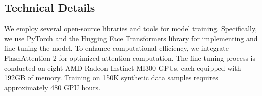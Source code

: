 \begin{table}[h]
\caption{Evaluation source for each model on three benchmarks. 
    \cmark\ indicates that the evaluation was conducted by ourselves, while \ostar\ indicates that results were sourced from the original benchmark. 
}
\centering
{}
\label{tab:appendix_model_info}
\end{table}

\subsection{Technical Details}
We employ several open-source libraries and tools for model training. Specifically, we use PyTorch \citep{paszke2019pytorch} and the Hugging Face Transformers library \citep{wolf2019huggingface} for implementing and fine-tuning the model. To enhance computational efficiency, we integrate FlashAttention 2 \citep{dao2023flashattention2} for optimized attention computation. The fine-tuning process is conducted on eight AMD Radeon Instinct MI300 GPUs, each equipped with 192GB of memory. Training on 150K synthetic data samples requires approximately 480 GPU hours.
